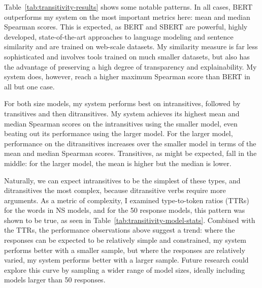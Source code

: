 Table~\ref{tab:transitivity-results} shows some notable patterns. In all cases, BERT outperforms my system on the most important metrics here: mean and median Spearman scores. This is expected, as BERT and SBERT are powerful, highly developed, state-of-the-art approaches to language modeling and sentence similarity and are trained on web-scale datasets. My similarity measure is far less sophisticated and involves tools trained on much smaller datasets, but also has the advantage of preserving a high degree of transparency and explainability. My system does, however, reach a higher maximum Spearman score than BERT in all but one case.

For both size models, my system performs best on intransitives, followed by transitives and then ditransitives. My system achieves its highest mean and median Spearman scores on the intransitives using the smaller model, even beating out its performance using the larger model. For the larger model, performance on the ditransitives increases over the smaller model in terms of the mean and median Spearman scores. Transitives, as might be expected, fall in the middle: for the larger model, the mean is higher but the median is lower.

Naturally, we can expect intransitives to be the simplest of these types, and ditransitives the most complex, because ditransitive verbs require more arguments. As a metric of complexity, I examined type-to-token ratios (TTRs) for the words in NS models, and for the 50 response models, this pattern was shown to be true, as seen in Table~\ref{tab:transitivity-model-stats}. Combined with the TTRs, the performance observations above suggest a trend: where the responses can be expected to be relatively simple and constrained, my system performs better with a smaller sample, but where the responses are relatively varied, my system performs better with a larger sample. Future research could explore this curve by sampling a wider range of model sizes, ideally including models larger than 50 responses.

